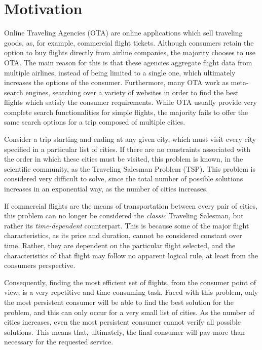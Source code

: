 \section{Motivation}

Online Traveling Agencies (OTA) are online applications which sell traveling goods, 
as, for example, commercial flight tickets.
Although consumers retain the option to buy flights directly from airline companies,
the majority chooses to use OTA.
The main reason for this is that these agencies aggregate flight data 
from multiple airlines, instead of being limited to a single one, 
which ultimately increases the options of the consumer.
Furthermore, many OTA work as meta-search engines, searching over a variety of websites
in order to find the best flights which satisfy the consumer requirements.
While OTA usually provide very complete search functionalities for simple flights,
the majority fails to offer the same search options for a trip composed of multiple cities. 

Consider a trip starting and ending at any given city,
which must visit every city specified in a particular list of cities. 
If there are no constraints associated with the order in which these cities must be visited, 
this problem is known, in the scientific community, 
as the Traveling Salesman Problem (TSP). This problem 
is considered very difficult to solve, since the total number 
of possible solutions increases in an exponential way, as the number of cities increases.

If commercial flights are the means of transportation between every pair of cities,
this problem can no longer be considered the \textit{classic} Traveling Salesman,
but rather its \textit{time-dependent} counterpart. This is because
some of the major flight characteristics, as its price and duration,
cannot be considered constant over time. Rather, they are dependent on the particular flight selected, 
and the characteristics of that flight may follow no
apparent logical rule, at least from the consumers perspective.

Consequently, finding the most efficient set of flights, from the consumer point of view,
is a very repetitive and time-consuming task. Faced with this problem, only the most 
persistent consumer will be able to find the best solution for the problem, and this can only 
occur for a very small list of cities. As the number of cities increases,
even the most persistent consumer cannot verify all possible solutions.
This means that, ultimately, the final consumer will pay more than necessary for the requested service.

